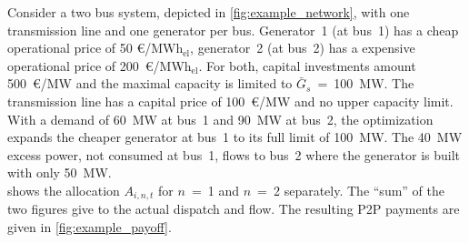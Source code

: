 \documentclass[11pt,twocolumn]{article}
\newcommand{\capacitygenerationupper}{\bar{G}_{s}}
\newcommand{\megawatthour}{MWh$_\text{el}$}
\newcommand{\allocatestate}[1][i, n]{A_{#1,t}}
\begin{document}
Consider a two bus system, depicted in \cref{fig:example_network}, with one transmission line and one generator per bus. Generator~1 (at bus~1) has a cheap operational price of 50 \euro/\megawatthour, generator~2 (at bus~2) has a expensive operational price of 200~\euro/\megawatthour. For both, capital investments amount 500~\euro/MW and the maximal capacity is limited to $\capacitygenerationupper$~=~100~MW. The transmission line has a capital price of 100~\euro/MW and no upper capacity limit. With a demand of 60~MW at bus~1 and 90~MW at bus~2, the optimization expands the cheaper generator at bus~1 to its full limit of 100~MW. The 40~MW excess power, not consumed at bus~1, flows to bus~2 where the generator is built with only 50~MW. \\
%  
% 
% 
% 
 shows the allocation $\allocatestate$ for $n$~=~1 and $n$~=~2 separately. The ``sum'' of the two figures give to the actual dispatch and flow. The resulting P2P payments are given in \cref{fig:example_payoff}.  
\end{document}
